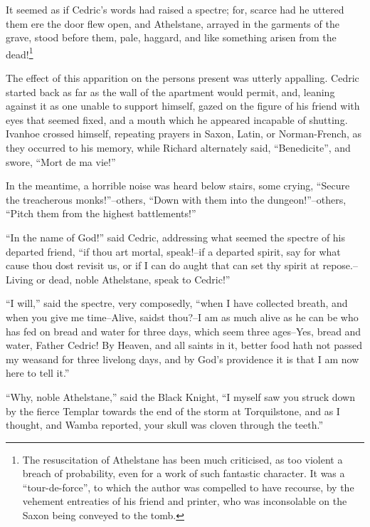 It seemed as if Cedric's words had raised a spectre; for, scarce had he
uttered them ere the door flew open, and Athelstane, arrayed in the
garments of the grave, stood before them, pale, haggard, and like
something arisen from the dead!\footnote{The resuscitation of Athelstane
has been much
criticised, as too violent a breach of probability, even for a work of
such fantastic character. It was a ``tour-de-force'', to which the
author was compelled to have recourse, by the vehement entreaties of his
friend and printer, who was inconsolable on the Saxon being conveyed to
the tomb.}

The effect of this apparition on the persons present was utterly
appalling. Cedric started back as far as the wall of the apartment would
permit, and, leaning against it as one unable to support himself, gazed
on the figure of his friend with eyes that seemed fixed, and a mouth
which he appeared incapable of shutting. Ivanhoe crossed himself,
repeating prayers in Saxon, Latin, or Norman-French, as they occurred to
his memory, while Richard alternately said, ``Benedicite'', and swore,
``Mort de ma vie!''

In the meantime, a horrible noise was heard below stairs, some crying,
``Secure the treacherous monks!''--others, ``Down with them into the
dungeon!''--others, ``Pitch them from the highest battlements!''

``In the name of God!'' said Cedric, addressing what seemed the spectre
of his departed friend, ``if thou art mortal, speak!--if a departed
spirit, say for what cause thou dost revisit us, or if I can do aught
that can set thy spirit at repose.--Living or dead, noble Athelstane,
speak to Cedric!''

``I will,'' said the spectre, very composedly, ``when I have collected
breath, and when you give me time--Alive, saidst thou?--I am as much
alive as he can be who has fed on bread and water for three days, which
seem three ages--Yes, bread and water, Father Cedric! By Heaven, and all
saints in it, better food hath not passed my weasand for three livelong
days, and by God's providence it is that I am now here to tell it.''

``Why, noble Athelstane,'' said the Black Knight, ``I myself saw you
struck down by the fierce Templar towards the end of the storm at
Torquilstone, and as I thought, and Wamba reported, your skull was
cloven through the teeth.''

